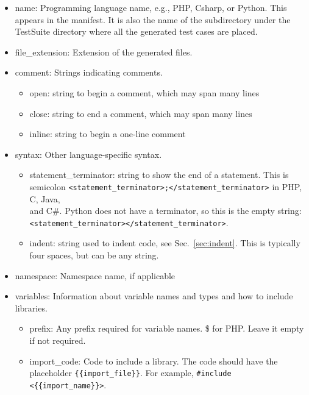 \documentclass[12pt]{article}
\newcommand{\CSharp}{C{\fontseries{b}\selectfont\#}}
\begin{document}
\begin{itemize}
    \item name: Programming language name, e.g., PHP, Csharp,
    or Python. This appears in the manifest.
    It is also the name of the subdirectory under the TestSuite directory
    where all the generated test cases are placed.

    \item file\_extension: Extension of the generated files.

    \item comment: Strings indicating comments.
    \begin{itemize}
        \item open: string to begin a comment, which may span many lines
        \item close: string to end a comment, which may span many lines
        \item inline: string to begin a one-line comment
    \end{itemize}
    
    \item syntax: Other language-specific syntax.
    \begin{itemize}
        \item statement\_terminator: string to show the end of 
        a statement.
        This is semicolon
        \verb|<statement_terminator>;</statement_terminator>|
        in PHP, C, Java, \\ and \CSharp. Python does not have 
        a terminator, so this is the empty string: \\
        \verb|<statement_terminator></statement_terminator>|.

        \item indent: string used to indent code, see Sec.~\ref{sec:indent}.
          This is typically four spaces, but
          can be any string.
    \end{itemize}
    
    \item namespace: Namespace name, if applicable

    \item variables: Information about variable names and types and how
    to include libraries.
    \begin{itemize}
        \item prefix: Any prefix required for variable names.
        \$ for PHP.
        Leave it empty if not required.

        \item import\_code: Code to include a library. The code
        should have the placeholder \verb|{{import_file}}|.
        For example, \verb|#include <{{import_name}}>|.
        

\end{itemize}
\end{itemize}
\end{document}
